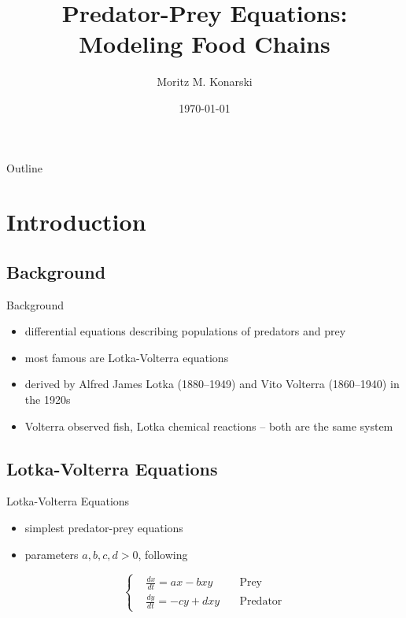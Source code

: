 \documentclass[hyperref={colorlinks,allcolors=black}]{beamer}
\title[Predator-Prey Equations]{Predator-Prey Equations:\\Modeling Food Chains}
\author[M. Konarski]{Moritz M. Konarski}
\institute[AUCA]{Applied Mathematics Department \newline 
    American University of Central Asia}
\date{\today}
\begin{document}
\begin{frame}
  \titlepage
\end{frame}

\begin{frame}{Outline}
  \tableofcontents
\end{frame}

\section{Introduction}

\subsection{Background}

\begin{frame}{Background}
\begin{itemize}
\setlength\itemsep{1em}
    \item differential equations describing populations of predators and prey
    \item most famous are Lotka-Volterra equations
    \item derived by Alfred James Lotka (1880--1949) and Vito Volterra
        (1860--1940) \cite{hoppensteadt} in the 1920s
    \item Volterra observed fish, Lotka chemical reactions -- both are the same
        system \cite{hoppensteadt}
\end{itemize}
\end{frame}

\subsection[Equations]{Lotka-Volterra Equations}

\begin{frame}{Lotka-Volterra Equations}
\begin{itemize}
\setlength\itemsep{1em}
    \item simplest predator-prey equations
    \item parameters $a,b,c,d>0$, following \cite{chauvet}
\end{itemize}
\begin{equation}    
    \left\{\begin{aligned}
        &\frac{dx}{dt} = ax - bxy \quad &\text{Prey}\\
        &\frac{dy}{dt} = -cy +dxy \quad &\text{Predator}
    \end{aligned}\right.
    \label{eq:2s_system}
\end{equation}
\end{frame}
\end{document}
